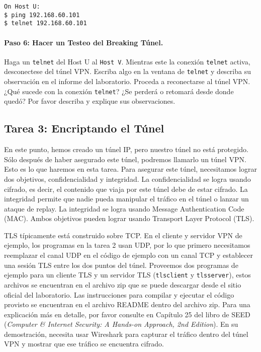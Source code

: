 \begin{lstlisting}
On Host U:
$ ping 192.168.60.101
$ telnet 192.168.60.101
\end{lstlisting}


\paragraph{Paso 6: Hacer un Testeo del Breaking Túnel.} 
Haga un \texttt{telnet} del Host U al \texttt{Host V}. Mientras este la conexión \texttt{telnet} activa, desconectese del túnel VPN. Escriba algo en la ventana de \texttt{telnet} y describa su observación en el informe del laboratorio.
Proceda a reconectarse al túnel VPN. ¿Qué sucede con la conexión \texttt{telnet}? ¿Se perderá o retomará desde donde quedó?
Por favor describa y explique sus observaciones.


\subsection{Tarea 3: Encriptando el Túnel}

En este punto, hemos creado un túnel IP, pero nuestro túnel no está protegido.
Sólo después de haber asegurado este túnel, podremos llamarlo un túnel VPN.
Esto es lo que haremos en esta tarea.
Para asegurar este túnel, necesitamos lograr dos objetivos, confidencialidad y integridad.
La confidencialidad se logra usando cifrado, es decir, el contenido que viaja por este túnel debe de estar cifrado.
La integridad permite que nadie pueda manipular el tráfico en el túnel o lanzar un ataque de replay.
La integridad se logra usando Message Authentication Code (MAC).
Ambos objetivos pueden lograr usando Transport Layer Protocol (TLS). 

TLS típicamente está construido sobre TCP. En el cliente y servidor VPN de ejemplo, los programas en la tarea 2 usan UDP, por lo que primero necesitamos reemplazar el canal UDP en el código de ejemplo con un canal TCP y establecer una sesión TLS entre los dos puntos del túnel. Proveemos dos programas de ejemplo para un cliente TLS y un servidor TLS (\texttt{tlsclient} y \texttt{tlsserver}), estos archivos se encuentran en el archivo zip que se puede descargar desde el sitio oficial del laboratorio.
Las instrucciones para compilar y ejecutar el código provisto se encuentran en el archivo README dentro del archivo zip.
Para una explicación más en detalle, por favor consulte en Capítulo 25 del libro de SEED (\textit{Computer \& Internet Security: A Hands-on Approach, 2nd Edition}). En su demostración, necesita usar Wireshark para capturar el tráfico dentro del túnel VPN y mostrar que ese tráfico se encuentra cifrado.


